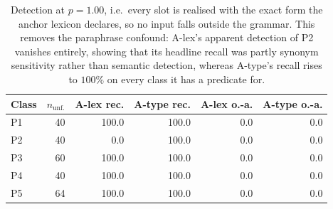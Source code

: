 \begin{table}[t]
\centering
\caption{Detection at $p = 1.00$, i.e.\ every slot is realised with the exact form the anchor lexicon declares, so no input falls outside the grammar. This removes the paraphrase confound: A-lex's apparent detection of P2 vanishes entirely, showing that its headline recall was partly synonym sensitivity rather than semantic detection, whereas A-type's recall rises to $100\%$ on every class it has a predicate for.}
\label{tab:canonical}
\small
\begin{tabular}{lrrrrr}
\toprule
Class & $n_{\text{unf.}}$ & A-lex rec. & A-type rec. & A-lex o.-a. & A-type o.-a. \\
\midrule
P1 & 40 & 100.0 & 100.0 & 0.0 & 0.0 \\
P2 & 40 & 0.0 & 100.0 & 0.0 & 0.0 \\
P3 & 60 & 100.0 & 100.0 & 0.0 & 0.0 \\
P4 & 40 & 100.0 & 100.0 & 0.0 & 0.0 \\
P5 & 64 & 100.0 & 100.0 & 0.0 & 0.0 \\
\bottomrule
\end{tabular}
\end{table}
